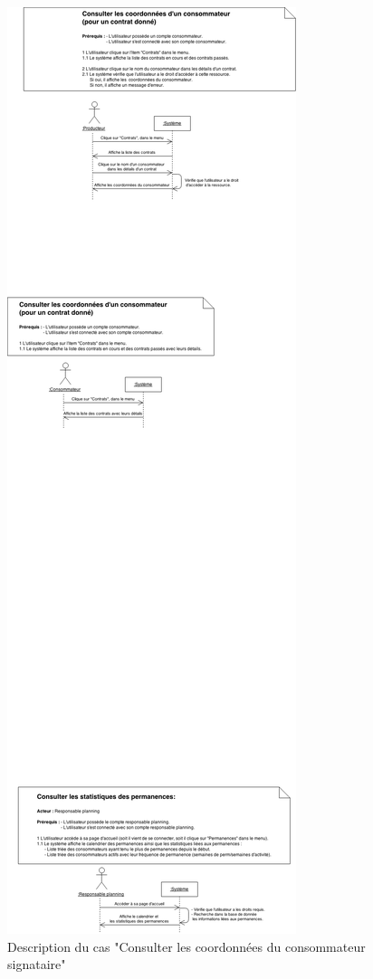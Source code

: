 \documentclass[12pt]{report}
\begin{document}
\begin{figure}[!h]
\centering
\includegraphics[width=1.\textwidth]{./ressources/desc_UC_coo_conso_contrats.png}
\caption{Description du cas "Consulter les coordonnées du consommateur signataire"}
\end{figure}
\clearpage
\end{document}
